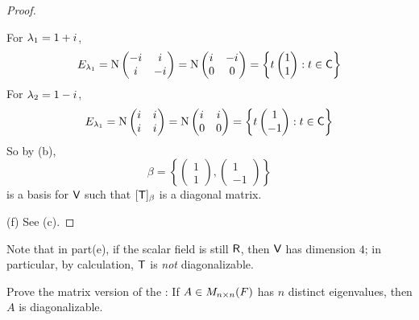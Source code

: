 \begin{proof}
\begin{enumerate}
For \(\lambda_1 = 1 + {i\mkern1mu}\),
\[
    E_{\lambda_1} = \mathrm{N} \begin{pmatrix}
        -{i\mkern1mu} & {i\mkern1mu} \\ {i\mkern1mu} & -{i\mkern1mu}
    \end{pmatrix} = \mathrm{N} \begin{pmatrix}
        {i\mkern1mu} & -{i\mkern1mu} \\ 0 & 0
    \end{pmatrix} = \left\{
        t \begin{pmatrix}
            1 \\ 1
        \end{pmatrix} : t \in \textsf{C}
    \right\}
\]
For \(\lambda_2 = 1 - {i\mkern1mu}\),
\[
    E_{\lambda_1} = \mathrm{N} \begin{pmatrix}
        {i\mkern1mu} & {i\mkern1mu} \\ {i\mkern1mu} & {i\mkern1mu}
    \end{pmatrix} = \mathrm{N} \begin{pmatrix}
        {i\mkern1mu} & {i\mkern1mu} \\ 0 & 0
    \end{pmatrix} = \left\{
        t \begin{pmatrix}
            1 \\ -1
        \end{pmatrix} : t \in \textsf{C}
    \right\}
\]
So by (b),
\[
    \beta = \left\{
        \begin{pmatrix} 1 \\ 1 \end{pmatrix},
        \begin{pmatrix} 1 \\ -1 \end{pmatrix}
    \right\}
\]
is a basis for \(\textsf{V}\) such that \([\textsf{T}]_{\beta}\) is a diagonal matrix.
\end{enumerate}

(f) See (c).
\end{proof}

\begin{remark} \label{remark 5.2.9}
Note that in part(e), if the scalar field is still \(\textsf{R}\), then \(\textsf{V}\) has dimension \(4\);
in particular, by calculation, \(\textsf{T}\) is \emph{not} diagonalizable.
\end{remark}

\begin{exercise} \label{exercise 5.2.4}
Prove the matrix version of the :
If \(A \in M_{n \times n}(F)\) has \(n\) distinct eigenvalues, then \(A\) is diagonalizable.
\end{exercise}

